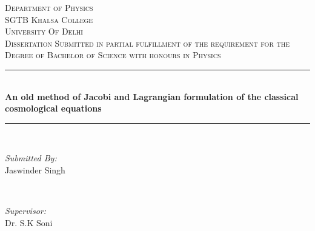 \documentclass[12pt]{article}
\begin{document}
\begin{titlepage}

\newcommand{\HRule}{\rule{\linewidth}{0.5mm}} %

\center %
 

\textsc{\LARGE Department of Physics \\SGTB Khalsa College\\ University Of Delhi }\\[1.5cm] %
\textsc{\Large Dissertation Submitted in partial fulfillment of the requirement for the Degree of Bachelor of Science with honours in Physics }\\[0.5cm] %



\HRule \\[0.4cm]
{ \large \bfseries An old method of Jacobi and Lagrangian formulation of the classical cosmological equations }\\[0.4cm] %
\HRule \\[1.5cm]
 

\begin{minipage}{0.4\textwidth}
\begin{flushleft} \large
\emph{Submitted By:}\\
Jaswinder Singh \textsc{} %
\end{flushleft}
\end{minipage}
~
\begin{minipage}{0.4\textwidth}
\begin{flushright} \large
\emph{Supervisor:} \\
Dr. S.K Soni  %
\end{flushright}
\end{minipage}\\[2cm]


\end{titlepage}
\end{document}
